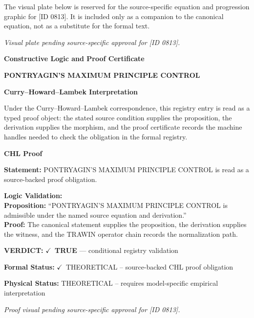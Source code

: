 \begingroup\footnotesize\sloppy
The visual plate below is reserved for the source-specific equation and progression graphic for [ID 0813]. It is included only as a companion to the canonical equation, not as a substitute for the formal text.
\par\endgroup
\begingroup\footnotesize\itshape
Visual plate pending source-specific approval for [ID 0813].
\par\endgroup

\clearpage
\begingroup\tzpsupportsetup
\noindent\textbf{\fontsize{10.8pt}{12.8pt}\selectfont [ID 0813] Constructive Logic and Proof Certificate}\par
\noindent\textbf{\fontsize{10pt}{12pt}\selectfont PONTRYAGIN'S MAXIMUM PRINCIPLE CONTROL}\par
\vspace{0.45em}
\begingroup
\footnotesize
\setlength{\parskip}{0.22em}
\setlength{\parindent}{0pt}
\noindent\textbf{Curry--Howard--Lambek Interpretation}\par
Under the Curry--Howard--Lambek correspondence, this registry entry is read as a typed proof
object: the stated source condition supplies the proposition, the derivation supplies the
morphism, and the proof certificate records the machine handles needed to check the obligation
in the formal registry.

\vspace{0.45em}
\noindent\textbf{CHL Proof}\par
\textbf{Statement:} PONTRYAGIN'S MAXIMUM PRINCIPLE CONTROL is read as a source-backed proof obligation.

\textbf{Logic Validation:}\\
\textbf{Proposition:} ``PONTRYAGIN'S MAXIMUM PRINCIPLE CONTROL is admissible under the named source equation and derivation.''\\
\textbf{Proof:} The canonical statement supplies the proposition, the derivation supplies the witness, and the TRAWIN operator chain records the normalization path.

\textbf{VERDICT:} \ensuremath{\checkmark}\ \textbf{TRUE} --- conditional registry validation

\textbf{Formal Status:} \ensuremath{\checkmark}\ THEORETICAL -- source-backed CHL proof obligation

\textbf{Physical Status:} THEORETICAL -- requires model-specific empirical interpretation
\par\vspace{0.45em}
\par
\vfill
\begingroup\footnotesize\itshape
Proof visual pending source-specific approval for [ID 0813].
\par\endgroup
\vfill
\endgroup
\endgroup

